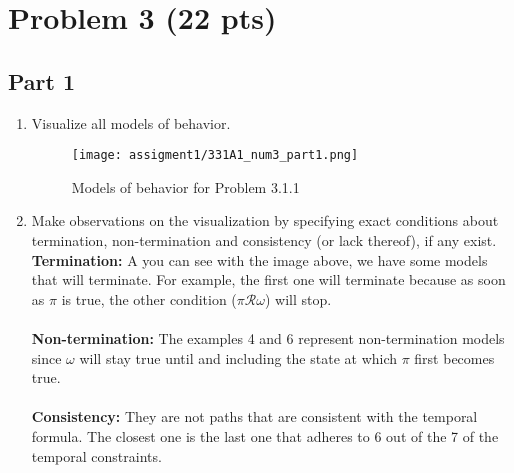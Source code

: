 \clearpage
\newpage

\section{Problem 3 (22 pts)}

\subsection{Part 1}
\begin{enumerate}
    \item Visualize all models of behavior.
    \begin{figure}[hbt!]
        \centering
        \texttt{[image: assigment1/331A1\_num3\_part1.png]}
        \caption{Models of behavior for Problem 3.1.1}
        \label{fig:model_behavior}
    \end{figure}

    \item Make observations on the visualization by specifying exact conditions about
termination, non-termination and consistency (or lack thereof), if any exist.\\

\textbf{Termination: } A you can see with the image above, we have some models that will terminate. For example, the first one will terminate because as soon as $\pi$ is true, the other condition ($\pi\mathcal{R}\omega$) will stop.\\ \\
\textbf{Non-termination: } The examples 4 and 6 represent non-termination models since $\omega$ will stay true until and including the state at which $\pi$ first becomes true.\\ \\
\textbf{Consistency: } They are not paths that are consistent with the temporal formula. The closest one is the last one that adheres to 6 out of the 7 of the temporal constraints.\\ \\

\end{enumerate}

